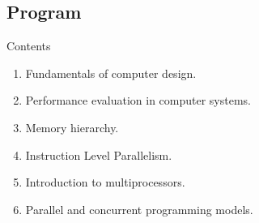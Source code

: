 \subsection{Program}

\begin{frame}[t]{Contents}
\begin{enumerate}
  \item Fundamentals of computer design.
  \item Performance evaluation in computer systems.
  \item Memory hierarchy.
  \item Instruction Level Parallelism.
  \item Introduction to multiprocessors.
  \item Parallel and concurrent programming models.
\end{enumerate}
\end{frame}
